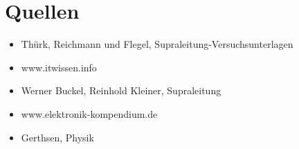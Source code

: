 
	
	\maketitle
	\tableofcontents
	\newpage

	
	\newpage
	
	\newpage
	

	\newpage
	
	\newpage
	
	\newpage


	\section{Quellen} %
	\label{sec:quellen}
	
		\begin{itemize}
			\item
				Thürk, Reichmann und Flegel, Supraleitung-Versuchsunterlagen 
			\item
				www.itwissen.info
			\item
				Werner Buckel, Reinhold Kleiner, Supraleitung
			\item
				www.elektronik-kompendium.de
			\item
				Gerthsen, Physik

		\end{itemize}



